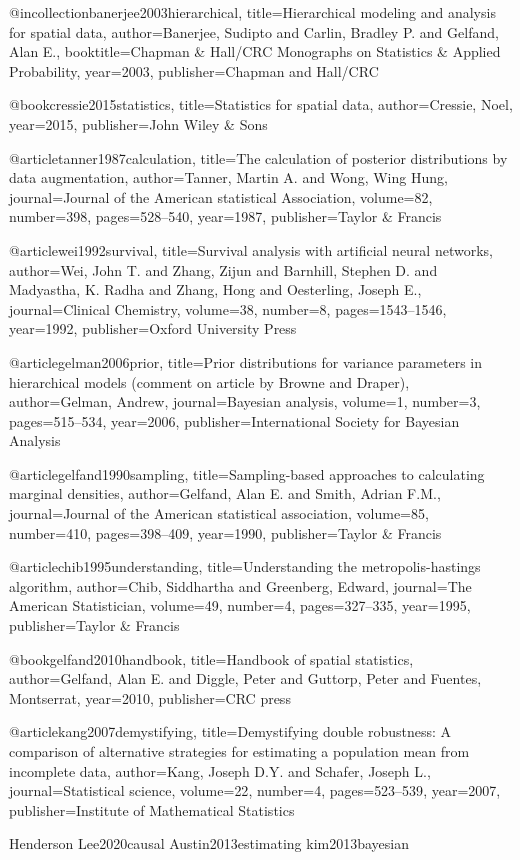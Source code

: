 @incollection{banerjee2003hierarchical,
  title={Hierarchical modeling and analysis for spatial data},
  author={Banerjee, Sudipto and Carlin, Bradley P. and Gelfand, Alan E.},
  booktitle={Chapman \& Hall/CRC Monographs on Statistics \& Applied Probability},
  year={2003},
  publisher={Chapman and Hall/CRC}
}

@book{cressie2015statistics,
  title={Statistics for spatial data},
  author={Cressie, Noel},
  year={2015},
  publisher={John Wiley \& Sons}
}

@article{tanner1987calculation,
  title={The calculation of posterior distributions by data augmentation},
  author={Tanner, Martin A. and Wong, Wing Hung},
  journal={Journal of the American statistical Association},
  volume={82},
  number={398},
  pages={528--540},
  year={1987},
  publisher={Taylor \& Francis}
}

@article{wei1992survival,
  title={Survival analysis with artificial neural networks},
  author={Wei, John T. and Zhang, Zijun and Barnhill, Stephen D. and Madyastha, K. Radha and Zhang, Hong and Oesterling, Joseph E.},
  journal={Clinical Chemistry},
  volume={38},
  number={8},
  pages={1543--1546},
  year={1992},
  publisher={Oxford University Press}
}

@article{gelman2006prior,
  title={Prior distributions for variance parameters in hierarchical models (comment on article by Browne and Draper)},
  author={Gelman, Andrew},
  journal={Bayesian analysis},
  volume={1},
  number={3},
  pages={515--534},
  year={2006},
  publisher={International Society for Bayesian Analysis}
}

@article{gelfand1990sampling,
  title={Sampling-based approaches to calculating marginal densities},
  author={Gelfand, Alan E. and Smith, Adrian F.M.},
  journal={Journal of the American statistical association},
  volume={85},
  number={410},
  pages={398--409},
  year={1990},
  publisher={Taylor \& Francis}
}

@article{chib1995understanding,
  title={Understanding the metropolis-hastings algorithm},
  author={Chib, Siddhartha and Greenberg, Edward},
  journal={The American Statistician},
  volume={49},
  number={4},
  pages={327--335},
  year={1995},
  publisher={Taylor \& Francis}
}

@book{gelfand2010handbook,
  title={Handbook of spatial statistics},
  author={Gelfand, Alan E. and Diggle, Peter and Guttorp, Peter and Fuentes, Montserrat},
  year={2010},
  publisher={CRC press}
}

@article{kang2007demystifying,
  title={Demystifying double robustness: A comparison of alternative strategies for estimating a population mean from incomplete data},
  author={Kang, Joseph D.Y. and Schafer, Joseph L.},
  journal={Statistical science},
  volume={22},
  number={4},
  pages={523--539},
  year={2007},
  publisher={Institute of Mathematical Statistics}
}





Henderson
Lee2020causal
Austin2013estimating
kim2013bayesian
